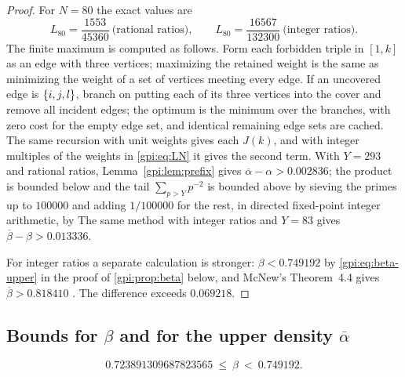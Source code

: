 \begin{proof}
For $N=80$ the exact values are
\[
 L_{80}=\frac{1553}{45360}\ \text{(rational ratios)},\qquad
 L_{80}=\frac{16567}{132300}\ \text{(integer ratios)}.
\]
The finite maximum is computed as follows. Form each forbidden triple in $[1,k]$ as an edge
with three vertices; maximizing the retained weight is the same as minimizing the weight of a
set of vertices meeting every edge. If an uncovered edge is $\{i,j,l\}$, branch on putting
each of its three vertices into the cover and remove all incident edges; the optimum is the
minimum over the branches, with zero cost for the empty edge set, and identical remaining
edge sets are cached. The same recursion with unit weights gives each $J(k)$, and with integer
multiples of the weights in \eqref{gpi:eq:LN} it gives the second term. With $Y=293$ and
rational ratios, Lemma~\ref{gpi:lem:prefix} gives $\overline\alpha-\alpha>0.002836$; the product
is bounded below and the tail $\sum_{p>Y}p^{-2}$ is bounded above by sieving the primes up to
$100000$ and adding $1/100000$ for the rest, in directed fixed-point integer arithmetic, by
The same method with integer ratios and $Y=83$ gives $\overline\beta-\beta>0.013336$.

For integer ratios a separate calculation is stronger: $\beta<0.749192$ by
\eqref{gpi:eq:beta-upper} in the proof of \cref{gpi:prop:beta} below, and McNew's
Theorem~4.4 gives $\overline\beta>0.818410$ \cite{McNew2015Sets}. The difference exceeds
$0.069218$.
\end{proof}

\subsection{Bounds for \texorpdfstring{$\beta$}{beta} and for the upper density
\texorpdfstring{$\overline\alpha$}{alpha-bar}}\label{gpi:sec:bounds}
{\raggedright{}}

\begin{proposition}\label{gpi:prop:beta}
\[
 0.723891309687823565\ \le\ \beta\ <\ 0.749192 .
\]
\end{proposition}

